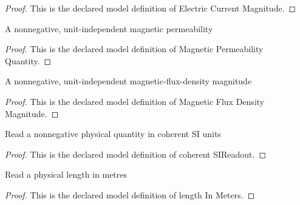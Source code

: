 \begin{proof}
  This is the declared model definition of Electric Current Magnitude.
\end{proof}
\begin{definition}
  \label{def:physics:phyx-mini-0961:phyxminiproblems-problemphyxmini0961-magneticpermeabilityquantity}
  A nonnegative, unit-independent magnetic permeability
\end{definition}
\begin{proof}
  This is the declared model definition of Magnetic Permeability Quantity.
\end{proof}
\begin{definition}
  \label{def:physics:phyx-mini-0961:phyxminiproblems-problemphyxmini0961-magneticfluxdensitymagnitude}
  A nonnegative, unit-independent magnetic-flux-density magnitude
\end{definition}
\begin{proof}
  This is the declared model definition of Magnetic Flux Density Magnitude.
\end{proof}
\begin{definition}
  \label{def:physics:phyx-mini-0961:phyxminiproblems-problemphyxmini0961-coherentsireadout}
  Read a nonnegative physical quantity in coherent SI units
\end{definition}
\begin{proof}
  This is the declared model definition of coherent SIReadout.
\end{proof}
\begin{definition}
  \label{def:physics:phyx-mini-0961:phyxminiproblems-problemphyxmini0961-lengthinmeters}
  Read a physical length in metres
\end{definition}
\begin{proof}
  This is the declared model definition of length In Meters.
\end{proof}
